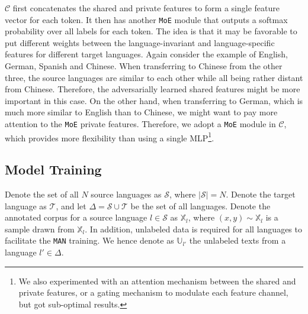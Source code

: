 \documentclass[11pt,a4paper]{article}
\def\gC{{\mathcal{C}}}
\def\gS{{\mathcal{S}}}
\def\gT{{\mathcal{T}}}
\def\sU{{\mathbb{U}}}
\def\sX{{\mathbb{X}}}
\newcommand{\man}{\texttt{MAN}}
\newcommand{\moe}{\texttt{MoE}}
\begin{document}
$\gC$ first concatenates the shared and private features to form a single feature vector for each token.
It then has another \moe{} module that outputs a softmax probability over all labels for each token.
The idea is that it may be favorable to put different weights between the language-invariant and language-specific features for different target languages.
Again consider the example of English, German, Spanish and Chinese.
When transferring to Chinese from the other three, the source languages are similar to each other while all being rather distant from Chinese.
Therefore, the adversarially learned shared features might be more important in this case.
On the other hand, when transferring to German, which is much more similar to English than to Chinese, we might want to pay more attention to the \moe{} private features.
Therefore, we adopt a \moe{} module in $\gC$, which provides more flexibility than using a single MLP\footnote{We also experimented with an attention mechanism between the shared and private features, or a gating mechanism to modulate each feature channel, but got sub-optimal results.}.
 \subsection{Model Training}\label{sec:training}
Denote the set of all $N$ source languages as $\gS$, where $|\gS|=N$.
Denote the target language as $\gT$, and let $\Delta=\gS \cup \gT$ be the set of all languages.
Denote the annotated corpus for a source language $l\in\gS$ as $\sX_l$, where $(x, y)\sim\sX_l$ is a sample drawn from $\sX_l$.
In addition, unlabeled data is required for all languages to facilitate the \man{} training.
We hence denote as $\sU_{l'}$ the unlabeled texts from a language $l'\in\Delta$.
\end{document}
